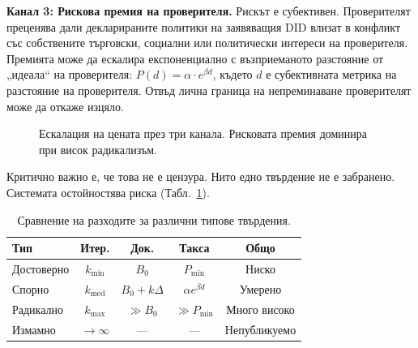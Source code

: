 \documentclass[11pt,a4paper,twocolumn]{article}
\begin{document}
\textbf{Канал 3: Рискова премия на проверителя.} Рискът е субективен. Проверителят преценява дали декларираните политики на заявяващия DID влизат в конфликт със собствените търговски, социални или политически интереси на проверителя. Премията може да ескалира експоненциално с възприеманото разстояние от „идеала“ на проверителя: $P(d) = \alpha \cdot e^{\beta d}$, където $d$ е субективната метрика на разстояние на проверителя. Отвъд лична граница на непреминаване проверителят може да откаже изцяло.

\begin{figure}[ht]
\centering
{}
\caption{Ескалация на цената през три канала. Рисковата премия доминира при висок радикализъм.}
\label{fig:radicalism}
\end{figure}

Критично важно е, че това не е цензура. Нито едно твърдение не е забранено. Системата остойностява риска (Табл.~\ref{tab:costs}).

\begin{table}[ht]
\centering
\caption{Сравнение на разходите за различни типове твърдения.}
\label{tab:costs}
\footnotesize
\begin{tabular}{@{}lcccc@{}}
\toprule
\textbf{Тип} & \textbf{Итер.} & \textbf{Док.} & \textbf{Такса} & \textbf{Общо} \\
\midrule
Достоверно & $k_{\min}$ & $B_0$ & $P_{\min}$ & Ниско \\
Спорно & $k_{\text{med}}$ & $B_0{+}k\Delta$ & $\alpha e^{\beta d}$ & Умерено \\
Радикално & $k_{\max}$ & $\gg B_0$ & $\gg P_{\min}$ & Много високо \\
Измамно & $\to\infty$ & --- & --- & Непубликуемо \\
\bottomrule
\end{tabular}
\end{table}
\end{document}
